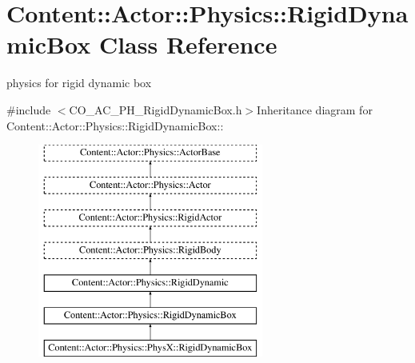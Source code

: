 \hypertarget{classContent_1_1Actor_1_1Physics_1_1RigidDynamicBox}{
\section{Content::Actor::Physics::RigidDynamicBox Class Reference}
\label{classContent_1_1Actor_1_1Physics_1_1RigidDynamicBox}
}


physics for rigid dynamic box  


{\ttfamily \#include $<$CO\_\-AC\_\-PH\_\-RigidDynamicBox.h$>$}Inheritance diagram for Content::Actor::Physics::RigidDynamicBox::\begin{figure}[H]
\begin{center}
\leavevmode
\includegraphics[height=7cm]{classContent_1_1Actor_1_1Physics_1_1RigidDynamicBox}
\end{center}
\end{figure}

